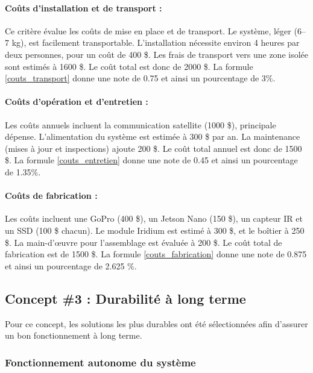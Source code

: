 \paragraph{Coûts d'installation et de transport :}
Ce critère évalue les coûts de mise en place et de transport. Le système, léger (6–7 kg), est facilement transportable.
L’installation nécessite environ 4 heures par deux personnes, pour un coût de 400 \$.
Les frais de transport vers une zone isolée sont estimés à 1600 \$.
Le coût total est donc de 2000 \$.
La formule \ref{couts_transport} donne une note de  0.75 et ainsi un pourcentage de 3\%. 

\paragraph{Coûts d'opération et d'entretien :}
Les coûts annuels incluent la communication satellite (1000 \$), principale dépense.
L’alimentation du système est estimée à 300 \$ par an.
La maintenance (mises à jour et inspections) ajoute 200 \$.
Le coût total annuel est donc de 1500 \$.
La formule \ref{couts_entretien} donne une note  de 0.45 et ainsi un pourcentage de 1.35\%.

\paragraph{Coûts de fabrication :}
Les coûts incluent une GoPro (400 \$), un Jetson Nano (150 \$), un capteur IR et un SSD (100 \$ chacun).
Le module Iridium est estimé à 300 \$, et le boîtier à 250 \$.
La main-d’œuvre pour l’assemblage est évaluée à 200 \$.
Le coût total de fabrication est de 1500 \$.
La formule \ref{couts_fabrication} donne une note de 0.875 et ainsi un pourcentage de  2.625 \%.


\subsection{Concept \#3 : Durabilité à long terme}

Pour ce concept, les solutions les plus durables ont été sélectionnées afin d'assurer un bon fonctionnement à long terme.

\subsubsection{Fonctionnement autonome du système}
\label{autonomie_concept_3}

